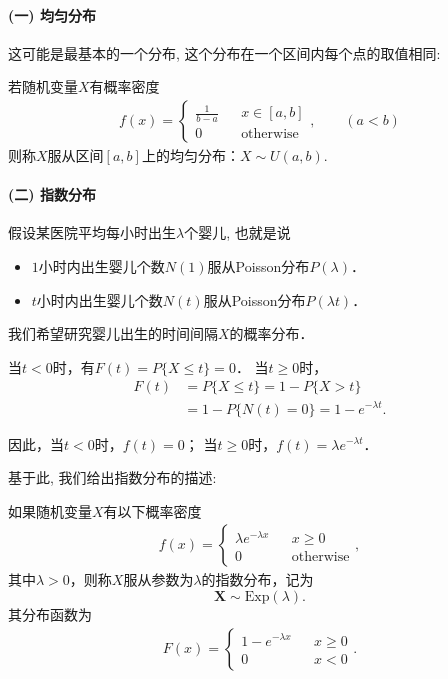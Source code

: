 \paragraph{(一) 均匀分布}

这可能是最基本的一个分布, 这个分布在一个区间内每个点的取值相同:

\begin{definition}
    若随机变量$X$有概率密度
    \begin{align*}
        f(x)=\left\{\begin{array}{lcl}
                        \frac1{b-a} &  & x\in [a,b]       \\
                        0           &  & \mbox{otherwise}
                    \end{array}\right. ,\qquad (a<b)
    \end{align*}
    则称$X$服从区间$[a,b]$上的均匀分布：$X\sim U(a,b)$.
\end{definition}%


\paragraph{(二) 指数分布}

假设某医院平均每小时出生$\lambda$个婴儿, 也就是说
\begin{itemize}
    \item $1$小时内出生婴儿个数$N(1)$服从Poisson分布$P(\lambda)$．
    \item $t$小时内出生婴儿个数$N(t)$服从Poisson分布$P(\lambda t)$．
\end{itemize}
我们希望研究婴儿出生的时间间隔$X$的概率分布．


当$t<0$时，有$F(t)=P\{X\le t\}=0$． 当$t\ge0$时，
\begin{align*}
    F(t) & =P\{X\le t\}=1-P\{X>t\}          \\
         & =1-P\{N(t)=0\}=1-e^{-\lambda t}.
\end{align*}

因此，当$t<0$时，$f(t)=0$； 当$t\ge0$时，$f(t)=\lambda e^{-\lambda t}$．

基于此, 我们给出指数分布的描述:
\begin{definition}
    如果随机变量$X$有以下概率密度
    \begin{align*}
        f(x)=\left\{\begin{array}{lcl}
                        \lambda e^{-\lambda x} &  & x\ge 0           \\
                        0                      &  & \mbox{otherwise}
                    \end{array}\right. ,
    \end{align*}
    其中$\lambda>0$，则称$X$服从参数为$\lambda$的指数分布，记为
    \[\pmb X\sim \text{Exp}(\lambda). \]
    其分布函数为
    \begin{align*}
        F(x)=\left\{\begin{array}{lcl}
                        1- e^{-\lambda x} &  & x\ge 0 \\
                        0                 &  & x<0
                    \end{array}\right. .
    \end{align*}
\end{definition}

